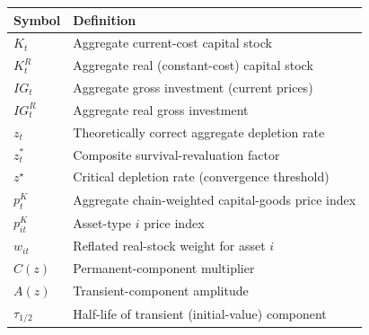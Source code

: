 \begin{center}
\small
\begin{tabular}{ll}
  \hline\hline
  Symbol & Definition \\
  \hline
  $K_t$ & Aggregate current-cost capital stock \\
  $K_t^{R}$ & Aggregate real (constant-cost) capital stock \\
  $IG_t$ & Aggregate gross investment (current prices) \\
  $IG_t^{R}$ & Aggregate real gross investment \\
  $z_t$ & Theoretically correct aggregate depletion rate \\
  $z_t^{\ast}$ & Composite survival-revaluation factor \\
  $z^{\star}$ & Critical depletion rate (convergence threshold) \\
  $p_t^{K}$ & Aggregate chain-weighted capital-goods price index \\
  $p_{it}^{K}$ & Asset-type $i$ price index \\
  $w_{it}$ & Reflated real-stock weight for asset $i$ \\
  $C(z)$ & Permanent-component multiplier \\
  $A(z)$ & Transient-component amplitude \\
  $\tau_{1/2}$ & Half-life of transient (initial-value) component \\
  \hline
\end{tabular}
\end{center}
